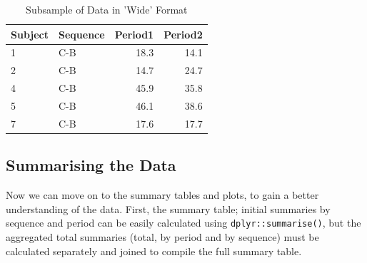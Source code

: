 \begin{Shaded}
\begin{Highlighting}[]
\OtherTok{\textless{}{-}}\SpecialCharTok{\%\textgreater{}\%}
  \NormalTok{(} 
               \NormalTok{)}
\end{Highlighting}
\end{Shaded}

\begin{table}
\centering
\caption{\label{tab:data-wide-demo}Subsample of Data in 'Wide' Format}
\centering
\begin{tabular}[t]{llrr}
\toprule
Subject & Sequence & Period1 & Period2\\
\midrule
1 & C-B & 18.3 & 14.1\\
2 & C-B & 14.7 & 24.7\\
4 & C-B & 45.9 & 35.8\\
5 & C-B & 46.1 & 38.6\\
7 & C-B & 17.6 & 17.7\\
\bottomrule
\end{tabular}
\end{table}

\subsection{Summarising the Data}\label{summarising-the-data}

Now we can move on to the summary tables and plots, to gain a better
understanding of the data. First, the summary table; initial summaries
by sequence and period can be easily calculated using
\texttt{dplyr::summarise()}, but the aggregated total summaries (total,
by period and by sequence) must be calculated separately and joined to
compile the full summary table.

